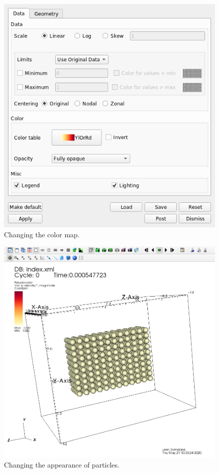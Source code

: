 \begin{paracol}{2}
  \switchcolumn
  \begin{figure}[htb!]
    \centering
    \includegraphics[width=\columnwidth]{FIGS/visit/visit_23.png}
    \caption{Changing the color map.}
    \label{fig:visit_23}
  \end{figure}

  \switchcolumn

  \begin{figure}[htb!]
    \centering
    \includegraphics[width=0.7\columnwidth]{FIGS/visit/visit_24.png}
    \caption{Changing the appearance of particles.}
    \label{fig:visit_24}
  \end{figure}
  
\end{paracol}

